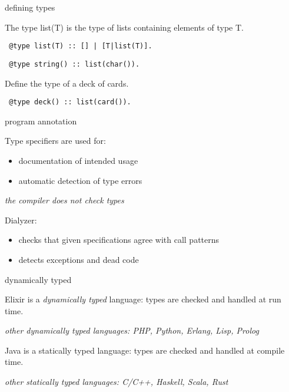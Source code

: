 \begin{frame}[fragile]{defining types}

The type list(T) is the type of lists containing elements of type T.
\pause

\begin{verbatim}
 @type list(T) :: [] | [T|list(T)].
\end{verbatim}

\pause
\begin{verbatim}
 @type string() :: list(char()).
\end{verbatim}

Define the type of a deck of cards.
\pause
\begin{verbatim}
 @type deck() :: list(card()).
\end{verbatim}

\end{frame}


\begin{frame}{program annotation}

Type specifiers are used for:
\begin{itemize}
\item documentation of intended usage
\pause
\item automatic detection of type errors
\end{itemize}

\pause\vspace{10pt}
{\em the compiler does not check types}

\pause\vspace{10pt}
Dialyzer:

\begin{itemize}
\item checks that given specifications agree with call patterns
\item detects exceptions and dead code 
\end{itemize}

\end{frame}


\begin{frame}{dynamically typed}

Elixir is a {\em dynamically typed} language: types are checked and handled at run time.

{\em other dynamically typed languages: PHP, Python, Erlang, Lisp, Prolog}

\vspace{20pt}

Java is a {statically typed} language: types are checked and handled at compile time.

{\em other statically typed languages: C/C++, Haskell, Scala, Rust}

\end{frame}

